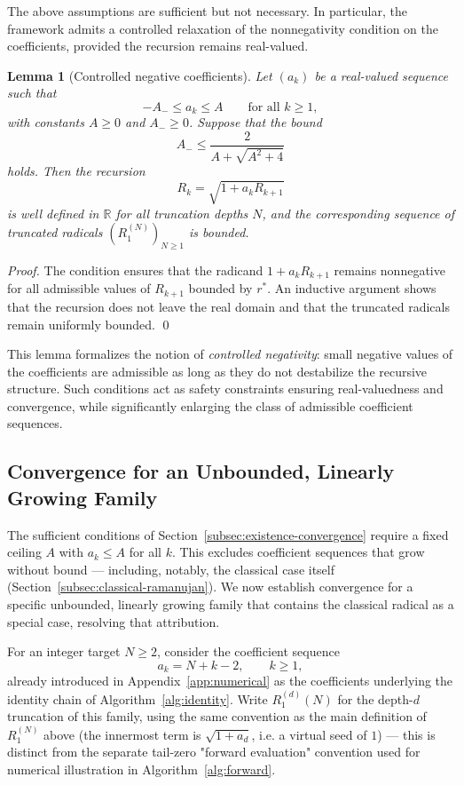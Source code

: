 \documentclass[11pt,a4paper]{amsart}
\theoremstyle{plain}
\newtheorem{lemma}[theorem]{Lemma}
\theoremstyle{definition}
\theoremstyle{remark}
\begin{document}
The above assumptions are sufficient but not necessary. In particular, the framework admits a controlled relaxation of the nonnegativity condition on the coefficients, provided the recursion remains real-valued.

\begin{lemma}[Controlled negative coefficients]
\label{lem:controlled-negativity}
Let $(a_k)$ be a real-valued sequence such that
\[
-A_- \leq a_k \leq A \qquad \text{for all } k \geq 1,
\]
with constants $A \geq 0$ and $A_- \geq 0$. Suppose that the bound
\[
A_- \leq \frac{2}{A + \sqrt{A^2 + 4}}
\]
holds. Then the recursion
\[
R_k = \sqrt{1 + a_k R_{k+1}}
\]
is well defined in $\mathbb{R}$ for all truncation depths $N$, and the corresponding sequence of truncated radicals $(R_1^{(N)})_{N \geq 1}$ is bounded.
\end{lemma}

\begin{proof}
The condition ensures that the radicand $1 + a_k R_{k+1}$ remains nonnegative for all admissible values of $R_{k+1}$ bounded by $r^{\ast}$. An inductive argument shows that the recursion does not leave the real domain and that the truncated radicals remain uniformly bounded. \qed
\end{proof}

This lemma formalizes the notion of \emph{controlled negativity}: small negative values of the coefficients are admissible as long as they do not destabilize the recursive structure. Such conditions act as safety constraints ensuring real-valuedness and convergence, while significantly enlarging the class of admissible coefficient sequences.

\subsection{Convergence for an Unbounded, Linearly Growing Family}
\label{subsec:unbounded-linear}

The sufficient conditions of Section~\ref{subsec:existence-convergence} require a fixed ceiling $A$ with $a_k \le A$ for all $k$. This excludes coefficient sequences that grow without bound — including, notably, the classical case itself (Section~\ref{subsec:classical-ramanujan}). We now establish convergence for a specific unbounded, linearly growing family that contains the classical radical as a special case, resolving that attribution.

For an integer target $N \ge 2$, consider the coefficient sequence
\[
a_k = N + k - 2, \qquad k \ge 1,
\]
already introduced in Appendix~\ref{app:numerical} as the coefficients underlying the identity chain of Algorithm~\ref{alg:identity}. Write $R_1^{(d)}(N)$ for the depth-$d$ truncation of this family, using the same convention as the main definition of $R_1^{(N)}$ above (the innermost term is $\sqrt{1+a_d}$, i.e. a virtual seed of $1$) — this is distinct from the separate tail-zero "forward evaluation" convention used for numerical illustration in Algorithm~\ref{alg:forward}.
\end{document}
